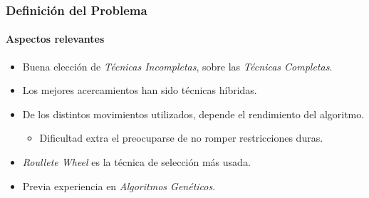 \frame
{
\frametitle{Definición del Problema}
\framesubtitle{Aspectos relevantes}
\begin{itemize}
    \item Buena elección de \emph{Técnicas Incompletas}, sobre las \emph{Técnicas Completas}.
    \item Los mejores acercamientos han sido técnicas híbridas.
    \item De los distintos movimientos utilizados, depende el rendimiento del algoritmo.
    \begin{itemize}
        \item Dificultad extra el preocuparse de no romper restricciones duras.
    \end{itemize}
    \item \emph{Roullete Wheel} es la técnica de selección más usada.
    \item Previa experiencia en \emph{Algoritmos Genéticos}.
\end{itemize}
}

